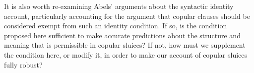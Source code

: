 \documentclass{turabian-researchpaper}
\begin{document}
It is also worth re-examining Abels' arguments about the syntactic identity account, particularly accounting for the argument that copular clauses should be considered exempt from such an identity condition. If so, is the condition proposed here sufficient to make accurate predictions about the structure and meaning that is permissible in copular sluices? If not, how must we supplement the condition here, or modify it, in order to make our account of copular sluices fully robust?  












\clearpage
\end{document}
